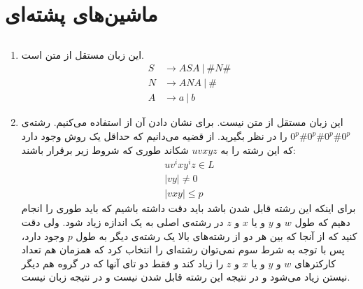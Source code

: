 \section{ماشین‌های پشته‌ای}
\subsection{}
\begin{enumerate}
    \item این زبان مستقل از متن است.
    \begin{align*}
        S &\rightarrow ASA ~|~ \#N\#\\
        N &\rightarrow ANA ~|~ \#\\
        A &\rightarrow a ~|~ b
    \end{align*}
    \item این زبان مستقل از متن نیست. برای نشان دادن آن از
    استفاده می‌کنیم. رشته‌ی
    $0^p\#0^p\#0^p\#0^p$
    را در نظر بگیرید. از قضیه می‌دانیم که حداقل یک روش وجود دارد که این رشته را به
    $uvxyz$
    شکاند طوری که شروط زیر برقرار باشند:
    \begin{gather*}
        uv^ixy^iz \in L\\
        |vy| \neq 0\\
        |vxy| \le p
    \end{gather*}
    برای اینکه این رشته قابل
    شدن باشد باید دقت داشته باشیم که باید طوری
    را انجام دهیم که طول
    $w$ و $y$
    و یا
    $x$ و $z$
    در رشته‌ی اصلی به یک اندازه زیاد شود. ولی دقت کنید که از آنجا که بین هر دو از رشته‌های بالا
    یک رشته‌ی دیگر به طول
    $p$
    وجود دارد، پس با توجه به شرط سوم
    نمی‌توان رشته‌ای را انتخاب کرد که همزمان هم تعداد کارکتر‌های
    $w$ و $y$
    و یا
    $x$ و $z$
    را زیاد کند و فقط دو تای آنها که در گروه هم دیگر نیستن زیاد می‌شود و در نتیجه این رشته قابل
    شدن نیست و در نتیجه زبان
    نیست.
\end{enumerate}
